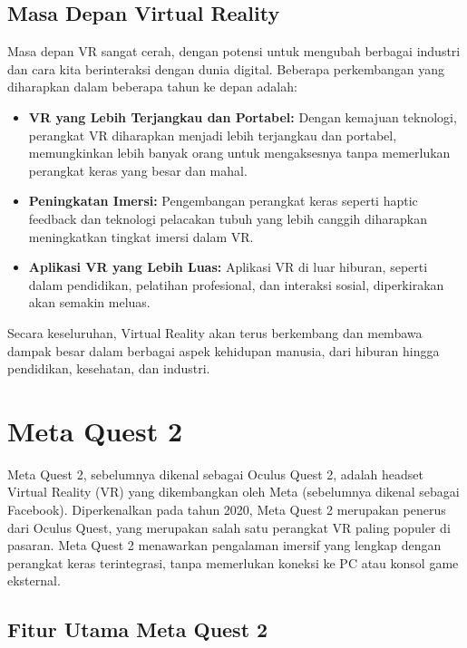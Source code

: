 \subsection{Masa Depan Virtual Reality}
\label{subsec:masadepan_vr}

Masa depan VR sangat cerah, dengan potensi untuk mengubah berbagai industri dan cara kita berinteraksi dengan dunia digital. Beberapa perkembangan yang diharapkan dalam beberapa tahun ke depan adalah:

\begin{itemize}
    \item \textbf{VR yang Lebih Terjangkau dan Portabel:} Dengan kemajuan teknologi, perangkat VR diharapkan menjadi lebih terjangkau dan portabel, memungkinkan lebih banyak orang untuk mengaksesnya tanpa memerlukan perangkat keras yang besar dan mahal.
    \item \textbf{Peningkatan Imersi:} Pengembangan perangkat keras seperti haptic feedback dan teknologi pelacakan tubuh yang lebih canggih diharapkan meningkatkan tingkat imersi dalam VR.
    \item \textbf{Aplikasi VR yang Lebih Luas:} Aplikasi VR di luar hiburan, seperti dalam pendidikan, pelatihan profesional, dan interaksi sosial, diperkirakan akan semakin meluas.
\end{itemize}

Secara keseluruhan, Virtual Reality akan terus berkembang dan membawa dampak besar dalam berbagai aspek kehidupan manusia, dari hiburan hingga pendidikan, kesehatan, dan industri.


\section{Meta Quest 2}
\label{sec:metaquest2}

Meta Quest 2, sebelumnya dikenal sebagai Oculus Quest 2, adalah headset Virtual Reality (VR) yang dikembangkan oleh Meta (sebelumnya dikenal sebagai Facebook). Diperkenalkan pada tahun 2020, Meta Quest 2 merupakan penerus dari Oculus Quest, yang merupakan salah satu perangkat VR paling populer di pasaran. Meta Quest 2 menawarkan pengalaman imersif yang lengkap dengan perangkat keras terintegrasi, tanpa memerlukan koneksi ke PC atau konsol game eksternal.

\subsection{Fitur Utama Meta Quest 2}
\label{subsec:fiturmetaquest2}

